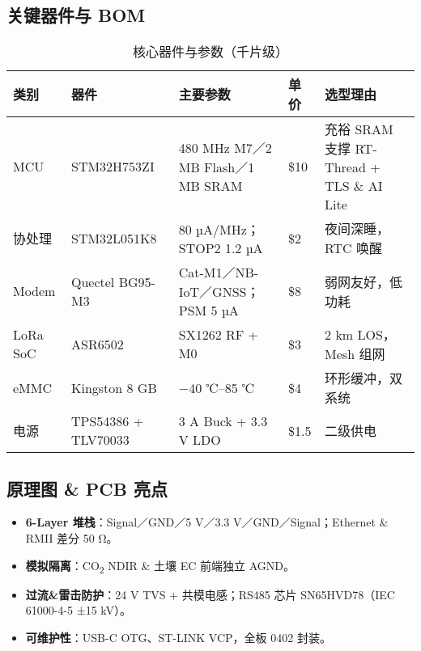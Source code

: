 \documentclass[UTF8,a4paper]{ctexart}
\newcommand{\tabfont}{\zihao{-5}}
\begin{document}
\subsection{关键器件与 BOM}
\begin{table}[htbp]
    \centering
    \caption{核心器件与参数（千片级）}
    \label{tab:bom}
    \tabfont
    \begin{tabular}{@{}llllp{5cm}@{}}
        \toprule
        \textbf{类别} & \textbf{器件} & \textbf{主要参数} & \textbf{单价} & \textbf{选型理由} \\ \midrule
        MCU & STM32H753ZI & 480 MHz M7／2 MB Flash／1 MB SRAM & \$10 & 充裕 SRAM 支撑 RT-Thread + TLS \& AI Lite \\
        协处理 & STM32L051K8 & 80 µA/MHz；STOP2 1.2 µA & \$2 & 夜间深睡，RTC 唤醒 \\
        Modem & Quectel BG95-M3 & Cat-M1／NB-IoT／GNSS；PSM 5 µA & \$8 & 弱网友好，低功耗 \\
        LoRa SoC & ASR6502 & SX1262 RF + M0 & \$3 & 2 km LOS，Mesh 组网 \\
        eMMC & Kingston 8 GB & −40 ℃–85 ℃ & \$4 & 环形缓冲，双系统 \\
        电源 & TPS54386 + TLV70033 & 3 A Buck + 3.3 V LDO & \$1.5 & 二级供电 \\ \bottomrule
    \end{tabular}
\end{table}

\subsection{原理图 \& PCB 亮点}
\begin{itemize}
    \item \textbf{6-Layer 堆栈}：Signal／GND／5 V／3.3 V／GND／Signal；Ethernet \& RMII 差分 50 Ω。
    \item \textbf{模拟隔离}：CO\textsubscript{2} NDIR \& 土壤 EC 前端独立 AGND。
    \item \textbf{过流\&雷击防护}：24 V TVS + 共模电感；RS485 芯片 SN65HVD78（IEC 61000-4-5 ±15 kV）。
    \item \textbf{可维护性}：USB-C OTG、ST-LINK VCP，全板 0402 封装。
\end{itemize}
\end{document}
